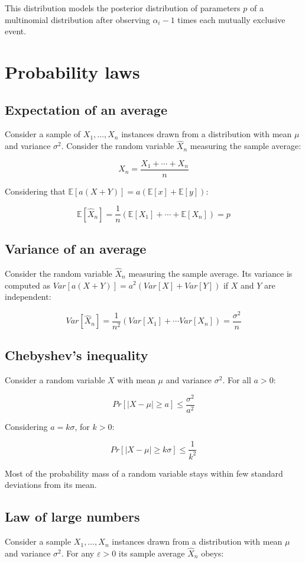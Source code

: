 		This distribution models the posterior distribution of parameters $p$ of a multinomial distribution after observing $\alpha_i -1$ times each mutually exclusive event.

\section{Probability laws}

	\subsection{Expectation of an average}
	Consider a sample of $X_1, \dots, X_n$ instances drawn from a distribution with mean $\mu$ and variance $\sigma^2$.
	Consider the random variable $\hat{X}_n$ measuring the sample average:

	$$\hat{X}_n = \frac{X_1+\cdots+X_n}{n}$$

	Considering that $\mathbb{E}[a(X+Y)] = a(\mathbb{E}[x] + \mathbb{E}[y])$:

	$$\mathbb{E}[\hat{X}_n] = \frac{1}{n}(\mathbb{E}[X_1] + \cdots + \mathbb{E}[X_n]) = p$$

	\subsection{Variance of an average}
	Consider the random variable $\hat{X}_n$ measuring the sample average.
	Its variance is computed as $Var[a(X+Y)] = a^2(Var[X] + Var[Y])$ if $X$ and $Y$ are independent:

	$$Var[\hat{X}_n] = \frac{1}{n^2}(Var[X_1] + \cdots Var[X_n]) = \frac{\sigma^2}{n}$$

	\subsection{Chebyshev's inequality}
	Consider a random variable $X$ with mean $\mu$ and variance $\sigma^2$.
	For all $a >0$:

	$$Pr[|X-\mu|\ge a] \le \frac{\sigma^2}{a^2}$$

	Considering $a = k\sigma$, for $k > 0$:

	$$Pr[|X-\mu| \ge k\sigma] \le \frac{1}{k^2}$$

	Most of the probability mass of a random variable stays within few standard deviations from its mean.

	\subsection{Law of large numbers}
	Consider a sample $X_1, \dots, X_n$ instances drawn from a distribution with mean $\mu$ and variance $\sigma^2$.
	For any $\varepsilon >0$ its sample average $\hat{X}_n$ obeys:

